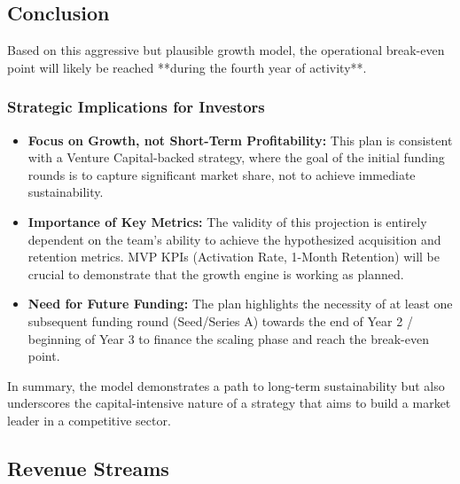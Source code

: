 \subsection{Conclusion}
Based on this aggressive but plausible growth model, the operational break-even point will likely be reached **during the fourth year of activity**.

\subsubsection*{Strategic Implications for Investors}
\begin{itemize}
    \item \textbf{Focus on Growth, not Short-Term Profitability:} This plan is consistent with a Venture Capital-backed strategy, where the goal of the initial funding rounds is to capture significant market share, not to achieve immediate sustainability.
    \item \textbf{Importance of Key Metrics:} The validity of this projection is entirely dependent on the team's ability to achieve the hypothesized acquisition and retention metrics. MVP KPIs (Activation Rate, 1-Month Retention) will be crucial to demonstrate that the growth engine is working as planned.
    \item \textbf{Need for Future Funding:} The plan highlights the necessity of at least one subsequent funding round (Seed/Series A) towards the end of Year 2 / beginning of Year 3 to finance the scaling phase and reach the break-even point.
\end{itemize}
In summary, the model demonstrates a path to long-term sustainability but also underscores the capital-intensive nature of a strategy that aims to build a market leader in a competitive sector.


\subsection{Revenue Streams}

